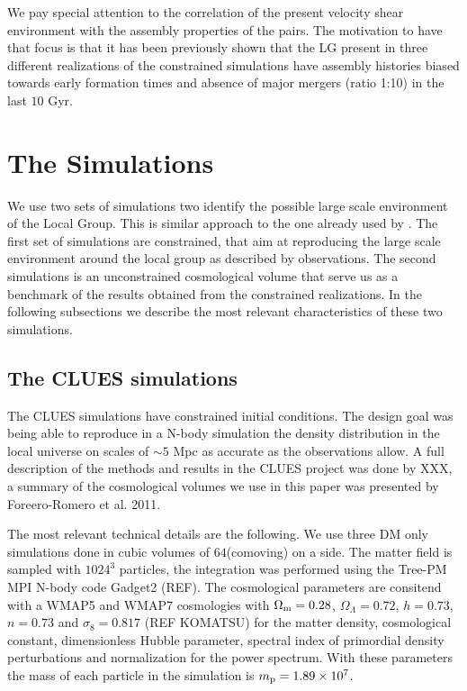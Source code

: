 \documentclass[usenatbib]{mn2e}
\begin{document}
We pay special attention to the correlation of the present velocity shear 
environment with the assembly properties of the pairs. The motivation to 
have that focus is that it has been previously shown that the LG present 
in three different realizations of the constrained simulations have 
assembly histories biased towards early formation times and absence of 
major mergers (ratio 1:10) in the last $10$ Gyr.


\section{The Simulations}
\label{sec:the_simulations}


We use two sets of simulations two identify the possible large scale 
environment of the Local Group. This is  similar approach to the one 
already used by . The first set of simulations are constrained, that aim 
at reproducing the large scale environment around the local group as 
described by observations. The second simulations is an unconstrained 
cosmological volume that serve us as a benchmark of the results obtained 
from the constrained realizations. In the following subsections we 
describe the most relevant characteristics of these two simulations.


\subsection{The CLUES simulations}
\label{subsec:CLUES_simulations}


The CLUES simulations have constrained initial conditions. The design goal 
was being able to reproduce in a N-body simulation the density distribution 
in the local universe on scales of $\sim5$ Mpc as accurate as the 
observations allow. A full description of the methods and results in the 
CLUES project was done by XXX, a summary  of the cosmological volumes we 
use in this paper was presented by Foreero-Romero et al. 2011. 


The most relevant technical details are the following. We use three DM only
simulations done in cubic volumes of $64$\hMpc (comoving) on a side. The 
matter field is sampled with $1024^3$ particles, the integration was 
performed using the Tree-PM MPI N-body code Gadget2 (REF). The cosmological 
parameters are consitend with a WMAP5 and WMAP7 cosmologies with 
$\Omega_{\rm m}=0.28$, $\Omega_{\Lambda}=0.72$, $h=0.73$, $n=0.73$ and 
$\sigma_{8}=0.817$ (REF KOMATSU) for the matter density, cosmological 
constant, dimensionless Hubble parameter, spectral index of primordial 
density perturbations and normalization for the power spectrum. With these 
parameters the mass of each particle in the simulation is 
$m_{\rm p}=1.89\times 10^{7}$\hMsun.
\end{document}
